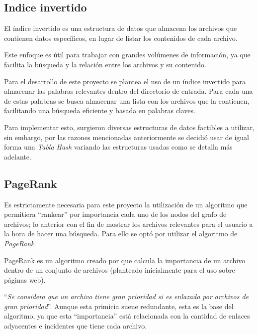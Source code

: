 \subsection{Indice invertido}
El índice invertido es una estructura de datos que almacena los archivos que contienen datos específicos, en lugar de listar los contenidos de cada archivo.

Este enfoque es útil para trabajar con grandes volúmenes de información, ya que facilita la búsqueda y la relación entre los archivos y su contenido.

Para el desarrollo de este proyecto se plantea el uso de un índice invertido para almacenar las palabras relevantes dentro del directorio de entrada. Para cada una de estas palabras se busca almacenar una lista con los archivos que la contienen, facilitando una búsqueda eficiente y basada en palabras claves.

Para implementar esto, surgieron diversas estructuras de datos factibles a utilizar, sin embargo, por las razones mencionadas anteriormente se decidió usar de igual forma una \textit{Tabla Hash} variando las estructuras usadas como se detalla más adelante.

\subsection{PageRank} \label{Subsec:PageRank}
Es estrictamente necesaria para este proyecto la utilización de un algoritmo que permitiera ``rankear'' por importancia cada uno de los nodos del grafo de archivos; lo anterior con el fin de mostrar los archivos relevantes para el usuario a la hora de hacer una búsqueda. Para ello se optó por utilizar el algoritmo de \textit{PageRank}.

PageRank es un algoritmo creado por \textcite{PageRankArticle} que calcula la importancia de un archivo dentro de un conjunto de archivos (planteado inicialmente para el uso sobre páginas web).

``\textit{Se considera que un archivo tiene gran prioridad si es enlazado por archivos de gran prioridad}''. Aunque esta primicia suene redundante, esta es la base del algoritmo, ya que esta ``importancia'' está relacionada con la cantidad de enlaces adyacentes e incidentes que tiene cada archivo.

